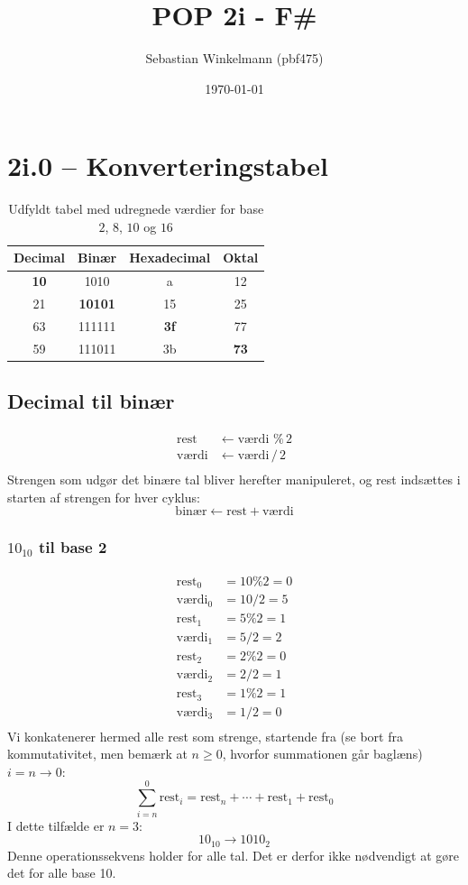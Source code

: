 \documentclass{article}
\title{POP 2i - F\#}
\author{Sebastian Winkelmann (pbf475)}
\date{\today}
\begin{document}
\maketitle
\section*{2i.0 -- Konverteringstabel}
\begin{table}[H]
\centering
\begin{tabular}{|c|c|c|c|}
\hline
Decimal & Binær & Hexadecimal & Oktal \\ \hline
\textbf{10} & 1010 & a & 12 \\ \hline
21 & \textbf{10101} & 15 & 25 \\ \hline
63 & 111111 & \textbf{3f} & 77 \\ \hline
59 & 111011 & 3b & \textbf{73} \\ \hline
\end{tabular}
\caption{Udfyldt tabel med udregnede værdier for base $2$, $8$, $10$ og $16$}
\end{table}
\subsection*{Decimal til binær}
\begin{align*}
    \text{rest} & \leftarrow \text{værdi } \%\, 2\\
    \text{værdi} & \leftarrow \text{værdi}\, /\, 2\\
\end{align*}
Strengen som udgør det binære tal bliver herefter manipuleret, og rest indsættes i starten af strengen for hver cyklus: $$\text{binær}\leftarrow\text{rest}+\text{værdi}$$
\subsubsection*{$10_{10}$ til base 2}
\begin{align*}
    \text{rest}_0&=10\%2=0\\
    \text{værdi}_0&=10/2=5\\
    \text{rest}_1&=5\%2=1\\
    \text{værdi}_1&=5/2=2\\
    \text{rest}_2&=2\%2=0\\
    \text{værdi}_2&=2/2=1\\
    \text{rest}_3&=1\%2=1\\
    \text{værdi}_3&=1/2=0\\
\end{align*}
Vi konkatenerer hermed alle rest som strenge, startende fra (se bort fra kommutativitet, men bemærk at $n\geq0$, hvorfor summationen går baglæns) $i=n\to0$:$$\sum_{i=n}^{0}\text{rest}_i=\text{rest}_n+\cdots+\text{rest}_1+\text{rest}_0$$I dette tilfælde er $n=3$:\begin{equation}
    10_{10}\rightarrow1010_2
\end{equation}
Denne operationssekvens holder for alle tal. Det er derfor ikke nødvendigt at gøre det for alle base 10.
\end{document}
